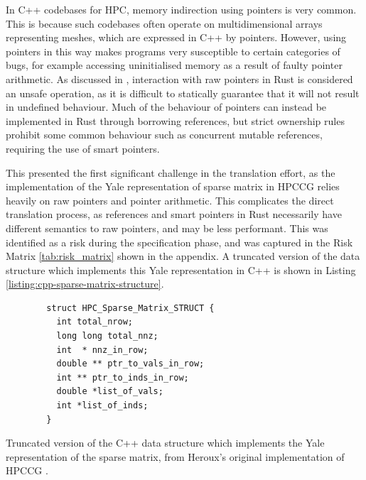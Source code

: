 In C++ codebases for \acrshort{HPC}, memory indirection using pointers is very common. This is because such codebases often operate on multidimensional arrays representing meshes, which are expressed in C++ by pointers. However, using pointers in this way makes programs very susceptible to certain categories of bugs, for example accessing uninitialised memory as a result of faulty pointer arithmetic. As discussed in , interaction with raw pointers in Rust is considered an unsafe operation, as it is difficult to statically guarantee that it will not result in undefined behaviour. Much of the behaviour of pointers can instead be implemented in Rust through borrowing references, but strict ownership rules prohibit some common behaviour such as concurrent mutable references, requiring the use of smart pointers.

This presented the first significant challenge in the translation effort, as the implementation of the Yale representation of sparse matrix in \acrshort{HPCCG} relies heavily on raw pointers and pointer arithmetic. This complicates the direct translation process, as references and smart pointers in Rust necessarily have different semantics to raw pointers, and may be less performant. This was identified as a risk during the specification phase, and was captured in the Risk Matrix \ref{tab:risk_matrix} shown in the appendix. A truncated version of the data structure which implements this Yale representation in C++ is shown in Listing \ref{listing:cpp-sparse-matrix-structure}.

\begin{listing}[H]
    \begin{verbatim}
        struct HPC_Sparse_Matrix_STRUCT {
          int total_nrow;
          long long total_nnz;
          int  * nnz_in_row;
          double ** ptr_to_vals_in_row;
          int ** ptr_to_inds_in_row;
          double *list_of_vals;
          int *list_of_inds;
        }
    \end{verbatim}
    \caption{Truncated version of the C++ data structure which implements the Yale representation of the sparse matrix, from Heroux's original implementation of \acrshort{HPCCG} \cite{MantevoHPCCG2023}.}
    \label{listing:cpp-sparse-matrix-structure}
\end{listing}


